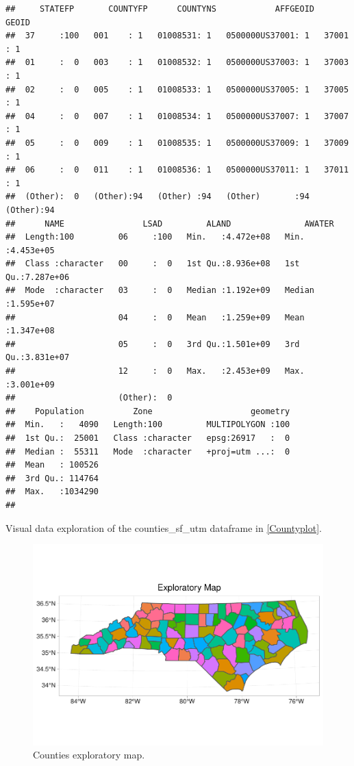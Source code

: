 \documentclass[12pt,]{article}
\begin{document}
\begin{verbatim}
##     STATEFP       COUNTYFP      COUNTYNS            AFFGEOID      GEOID   
##  37     :100   001    : 1   01008531: 1   0500000US37001: 1   37001  : 1  
##  01     :  0   003    : 1   01008532: 1   0500000US37003: 1   37003  : 1  
##  02     :  0   005    : 1   01008533: 1   0500000US37005: 1   37005  : 1  
##  04     :  0   007    : 1   01008534: 1   0500000US37007: 1   37007  : 1  
##  05     :  0   009    : 1   01008535: 1   0500000US37009: 1   37009  : 1  
##  06     :  0   011    : 1   01008536: 1   0500000US37011: 1   37011  : 1  
##  (Other):  0   (Other):94   (Other) :94   (Other)       :94   (Other):94  
##      NAME                LSAD         ALAND               AWATER         
##  Length:100         06     :100   Min.   :4.472e+08   Min.   :4.453e+05  
##  Class :character   00     :  0   1st Qu.:8.936e+08   1st Qu.:7.287e+06  
##  Mode  :character   03     :  0   Median :1.192e+09   Median :1.595e+07  
##                     04     :  0   Mean   :1.259e+09   Mean   :1.347e+08  
##                     05     :  0   3rd Qu.:1.501e+09   3rd Qu.:3.831e+07  
##                     12     :  0   Max.   :2.453e+09   Max.   :3.001e+09  
##                     (Other):  0                                          
##    Population          Zone                    geometry  
##  Min.   :   4090   Length:100         MULTIPOLYGON :100  
##  1st Qu.:  25001   Class :character   epsg:26917   :  0  
##  Median :  55311   Mode  :character   +proj=utm ...:  0  
##  Mean   : 100526                                         
##  3rd Qu.: 114764                                         
##  Max.   :1034290                                         
## 
\end{verbatim}

Visual data exploration of the counties\_sf\_utm dataframe in
\autoref{Countyplot}.

\begin{figure}
\centering
\includegraphics{./Outputunnamed-chunk-23-1.pdf}
\caption{Counties exploratory map. \label{Countyplot}}
\end{figure}
\end{document}
